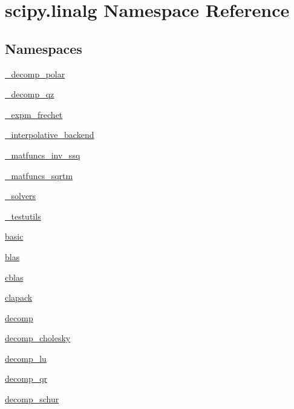 \hypertarget{namespacescipy_1_1linalg}{}\section{scipy.\+linalg Namespace Reference}
\label{namespacescipy_1_1linalg}
\subsection*{Namespaces}
\begin{DoxyCompactItemize}
\item 
 \hyperlink{namespacescipy_1_1linalg_1_1__decomp__polar}{\+\_\+decomp\+\_\+polar}
\item 
 \hyperlink{namespacescipy_1_1linalg_1_1__decomp__qz}{\+\_\+decomp\+\_\+qz}
\item 
 \hyperlink{namespacescipy_1_1linalg_1_1__expm__frechet}{\+\_\+expm\+\_\+frechet}
\item 
 \hyperlink{namespacescipy_1_1linalg_1_1__interpolative__backend}{\+\_\+interpolative\+\_\+backend}
\item 
 \hyperlink{namespacescipy_1_1linalg_1_1__matfuncs__inv__ssq}{\+\_\+matfuncs\+\_\+inv\+\_\+ssq}
\item 
 \hyperlink{namespacescipy_1_1linalg_1_1__matfuncs__sqrtm}{\+\_\+matfuncs\+\_\+sqrtm}
\item 
 \hyperlink{namespacescipy_1_1linalg_1_1__solvers}{\+\_\+solvers}
\item 
 \hyperlink{namespacescipy_1_1linalg_1_1__testutils}{\+\_\+testutils}
\item 
 \hyperlink{namespacescipy_1_1linalg_1_1basic}{basic}
\item 
 \hyperlink{namespacescipy_1_1linalg_1_1blas}{blas}
\item 
 \hyperlink{namespacescipy_1_1linalg_1_1cblas}{cblas}
\item 
 \hyperlink{namespacescipy_1_1linalg_1_1clapack}{clapack}
\item 
 \hyperlink{namespacescipy_1_1linalg_1_1decomp}{decomp}
\item 
 \hyperlink{namespacescipy_1_1linalg_1_1decomp__cholesky}{decomp\+\_\+cholesky}
\item 
 \hyperlink{namespacescipy_1_1linalg_1_1decomp__lu}{decomp\+\_\+lu}
\item 
 \hyperlink{namespacescipy_1_1linalg_1_1decomp__qr}{decomp\+\_\+qr}
\item 
 \hyperlink{namespacescipy_1_1linalg_1_1decomp__schur}{decomp\+\_\+schur}
\item 

\end{DoxyCompactItemize}
